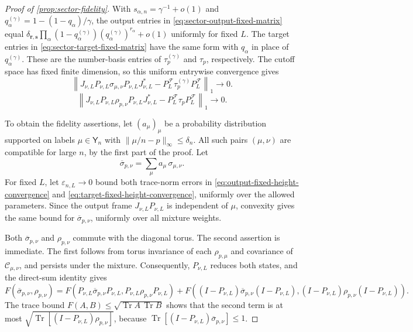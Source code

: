 \documentclass[11pt]{article}
\theoremstyle{remark}
\theoremstyle{plain}
\newcommand{\cC}{\mathcal C}
\newcommand{\cF}{\mathcal F}
\newcommand{\Tr}{\operatorname{Tr}}
\begin{document}
\begin{proof}[Proof of \cref{prop:sector-fidelity}]
With \(s_{\alpha,n}=\gamma^{-1}+o(1)\) and
\(q_\alpha^{(\gamma)}=1-(1-q_\alpha)/\gamma\), the output entries in
\eqref{eq:sector-output-fixed-matrix} equal
\(\delta_{\mathbf r,\mathbf s}\prod_\alpha
(1-q_\alpha^{(\gamma)})(q_\alpha^{(\gamma)})^{r_\alpha}+o(1)\)
uniformly for fixed \(L\).  The target entries in
\eqref{eq:sector-target-fixed-matrix} have the same form with
\(q_\alpha\) in place of \(q_\alpha^{(\gamma)}\).  These are the
number-basis entries of \(\tau_p^{(\gamma)}\) and \(\tau_p\),
respectively.  The cutoff space has
fixed finite dimension, so this uniform entrywise convergence gives
\begin{equation}\label{eq:output-fixed-height-convergence}
  \left\|
  J_{\nu,L}P_{\nu,L}\sigma_{\mu,\nu}P_{\nu,L}J_{\nu,L}^*
  -P_L^{\cF}\tau_p^{(\gamma)}P_L^{\cF}
  \right\|_1\longrightarrow0.
\end{equation}
\begin{equation}\label{eq:target-fixed-height-convergence}
  \left\|
  J_{\nu,L}P_{\nu,L}\rho_{p,\nu}P_{\nu,L}J_{\nu,L}^*
  -P_L^{\cF}\tau_pP_L^{\cF}
  \right\|_1\longrightarrow0.
\end{equation}

To obtain the fidelity assertions, let \((a_\mu)_\mu\) be a
probability distribution supported on labels \(\mu\in\mathsf Y_n\) with
\(\|\mu/n-p\|_\infty\le\delta_n\).
All such pairs \((\mu,\nu)\) are compatible for large \(n\), by the first
part of the proof.  Let
\[
  \overline\sigma_{p,\nu}
  =\sum_\mu a_\mu\,\sigma_{\mu,\nu}.
\]
For fixed \(L\), let \(\varepsilon_{n,L}\to0\) bound both trace-norm
errors in \eqref{eq:output-fixed-height-convergence} and
\eqref{eq:target-fixed-height-convergence}, uniformly over the allowed
parameters.  Since the output frame \(J_{\nu,L}P_{\nu,L}\) is independent
of \(\mu\), convexity gives the same bound for \(\overline\sigma_{p,\nu}\),
uniformly over all mixture weights.

Both \(\overline\sigma_{p,\nu}\) and \(\rho_{p,\nu}\)
commute with the diagonal torus.  The second assertion is immediate.
The first follows from torus invariance of each \(\rho_{p,\mu}\) and
covariance of \(\cC_{\mu,\nu}\), and persists under the mixture.
Consequently, \(P_{\nu,L}\) reduces both states, and the direct-sum
identity gives
\[
  F(\overline\sigma_{p,\nu},\rho_{p,\nu})
  =F(P_{\nu,L}\overline\sigma_{p,\nu}P_{\nu,L},
        P_{\nu,L}\rho_{p,\nu}P_{\nu,L})
  +F((I-P_{\nu,L})\overline\sigma_{p,\nu}(I-P_{\nu,L}),
       (I-P_{\nu,L})\rho_{p,\nu}(I-P_{\nu,L})).
\]
The trace bound
\(F(A,B)\le\sqrt{\Tr A\,\Tr B}\) shows that the second term is at most
\(\sqrt{\Tr[(I-P_{\nu,L})\rho_{p,\nu}]}\), because
\(\Tr[(I-P_{\nu,L})\overline\sigma_{p,\nu}]\le1\).


\end{proof}
\end{document}
